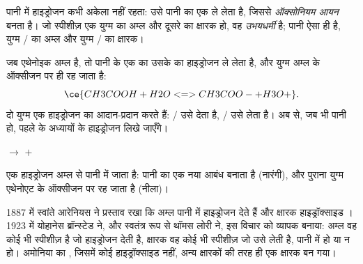 \begin{definition}\label{def:g12:ka-and-pka:oxonium}
पानी में हाइड्रोजन  कभी अकेला नहीं रहता: उसे पानी का एक
 ले लेता है, जिससे \emph{ऑक्सोनियम आयन}  बनता है।
जो स्पीशीज़ एक युग्म का अम्ल और दूसरे का क्षारक हो, वह
\emph{उभयधर्मी} है; पानी ऐसा ही है, युग्म
/ का अम्ल और युग्म / का क्षारक।
\end{definition}

\begin{example}[पानी में एक अम्ल]\label{ex:g12:ka-and-pka:acid-water}
जब एथेनोइक अम्ल  है, तो पानी के एक  का  उसके
 का हाइड्रोजन ले लेता है, और  युग्म अम्ल के ऑक्सीजन पर ही रह जाता है:
\[
  \ce{CH3COOH + H2O <=> CH3COO- + H3O+} .
\]
दो युग्म एक हाइड्रोजन  का आदान-प्रदान करते हैं: / उसे देता है,
/ उसे लेता है। अब से, जब भी पानी  हो, पहले के
अध्यायों के हाइड्रोजन   लिखे जाएँगे।
\end{example}

\begin{omfigure}
\qquad
{}
\qquad$\longrightarrow$\qquad
{}\quad$+$\quad{}

{\small एक हाइड्रोजन  अम्ल से पानी में जाता है: पानी का एक 
नया  आबंध बनाता है (नारंगी), और पुराना  युग्म
एथेनोएट  के ऑक्सीजन पर रह जाता है (नीला)।}
\end{omfigure}

\begin{history}[आरेनियस से ब्रॉन्स्टेड तक, 1887--1923]
1887 में स्वांते आरेनियस ने प्रस्ताव रखा कि अम्ल पानी में हाइड्रोजन  देते हैं
और क्षारक हाइड्रॉक्साइड । 1923 में योहानेस ब्रॉन्स्टेड ने, और स्वतंत्र रूप से
थॉमस लोरी ने, इस विचार को व्यापक बनाया: अम्ल वह कोई भी स्पीशीज़ है जो
हाइड्रोजन  देती है, क्षारक वह कोई भी स्पीशीज़ जो उसे लेती है, पानी में हो या न हो।
अमोनिया का , जिसमें कोई हाइड्रॉक्साइड नहीं, अन्य क्षारकों की तरह ही
एक क्षारक बन गया।
\end{history}

